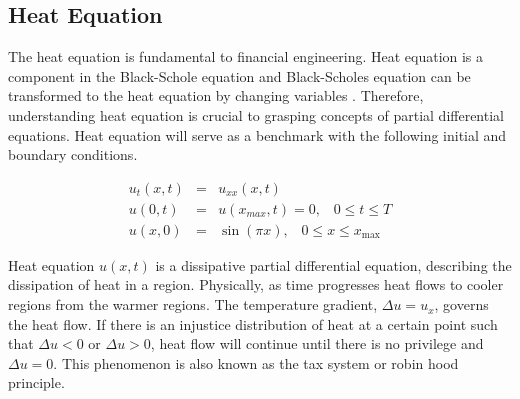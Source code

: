 \documentclass[12pt, oneside]{book}
\theoremstyle{plain}
\theoremstyle{definition}
\begin{document}
\subsection{Heat Equation}
The heat equation is fundamental to financial engineering. Heat equation is a component in the Black-Schole equation and Black-Scholes equation can be transformed to the heat equation by changing variables \cite{capinski}. Therefore, understanding heat equation is crucial to grasping concepts of partial differential equations. Heat equation will serve as a benchmark with the following initial and boundary conditions.

\begin{eqnarray} \label{HeatBase}
u_t(x,t) &=& u_{xx}(x, t) \\[10pt]
u(0, t) &=& u(x_{max}, t) = 0, \hspace{10pt} 0 \leq t \leq T \\[10pt]
u(x, 0) &=& \sin(\pi x), \hspace{10pt} 0 \leq x \leq x_{\max}
\end{eqnarray}

Heat equation $u(x, t)$ is a dissipative partial differential equation, describing the dissipation of heat in a region. Physically, as time progresses heat flows to cooler regions from the warmer regions. The temperature gradient, $\Delta u = u_x$, governs the heat flow. If there is an injustice distribution of heat at a certain point such that  $\Delta u < 0 $ or  $\Delta u > 0$, heat flow will continue until there is no privilege  and $\Delta u = 0 $. This phenomenon is also known as the tax system or robin hood principle.
\end{document}
